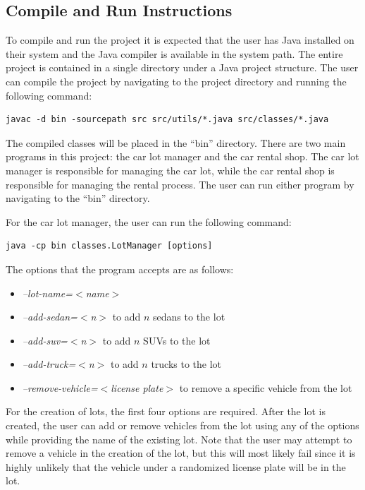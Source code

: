 \documentclass[conference]{IEEEtran}
\begin{document}
\subsection{Compile and Run Instructions}
To compile and run the project it is expected that the user has Java installed on their system and the Java compiler is available in the system path. The entire project is contained in a single directory under a Java project structure. The user can compile the project by navigating to the project directory and running the following command:

\begin{lstlisting}[style=input]
javac -d bin -sourcepath src src/utils/*.java src/classes/*.java 
\end{lstlisting}

The compiled classes will be placed in the ``bin'' directory. There are two main programs in this project: the car lot manager and the car rental shop. The car lot manager is responsible for managing the car lot, while the car rental shop is responsible for managing the rental process. The user can run either program by navigating to the ``bin'' directory.

For the car lot manager, the user can run the following command:
\begin{lstlisting}[style=input]
java -cp bin classes.LotManager [options]
\end{lstlisting}

The options that the program accepts are as follows:
\begin{itemize}
    \item \textit{--lot-name=$<$name$>$} 
    \item \textit{--add-sedan=$<$n$>$} to add $n$ sedans to the lot
    \item \textit{--add-suv=$<$n$>$} to add $n$ SUVs to the lot
    \item \textit{--add-truck=$<$n$>$} to add $n$ trucks to the lot
    \item \textit{--remove-vehicle=$<$license plate$>$} to remove a specific vehicle from the lot
\end{itemize}

For the creation of lots, the first four options are required. After the lot is created, the user can add or remove vehicles from the lot using any of the options while providing the name of the existing lot. Note that the user may attempt to remove a vehicle in the creation of the lot, but this will most likely fail since it is highly unlikely that the vehicle under a randomized license plate will be in the lot. 
\end{document}
